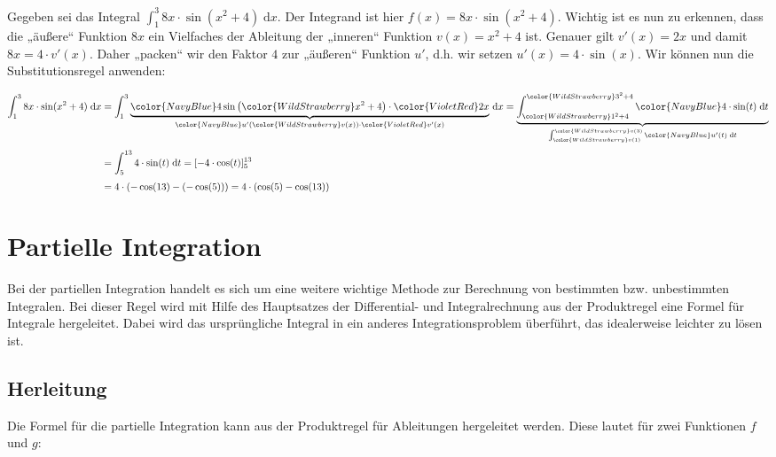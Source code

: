 \documentclass[fontsize=9pt,
               parskip=half-,
               DIV=14,
               listof=chapterentry,
               tocflat]{scrbook}
\begin{document}
\begin{example*}
Gegeben sei das Integral $\textstyle \int _{1}^{3}8x\cdot \sin(x^{2}+4)\;\mathrm {d} x$. Der Integrand ist hier $f(x)=8x\cdot \sin(x^{2}+4)$. Wichtig ist es nun zu erkennen, dass die „äußere“ Funktion $8x$ ein Vielfaches der Ableitung der „inneren“ Funktion $v(x)=x^{2}+4$ ist. Genauer gilt $v'(x)=2x$ und damit $8x=4\cdot v'(x)$. Daher „packen“ wir den Faktor $4$ zur „äußeren“ Funktion $u'$, d.h. wir setzen $u'(x)=4\cdot \sin(x)$. Wir können nun die Substitutionsregel anwenden:

\begin{align*}
\int _{1}^{3}8x\cdot \sin(x^{2}+4)\;\mathrm {d} x&=\int _{1}^{3}\underbrace {{\color {NavyBlue}4\sin \left({\color {WildStrawberry}x^{2}+4}\right)}\cdot {\color {VioletRed}2x}} _{{\color {NavyBlue}u'({\color {WildStrawberry}v(x)})}\cdot {\color {VioletRed}v'(x)}}\,\mathrm {d} x=\underbrace {\int _{\color {WildStrawberry}1^{2}+4}^{\color {WildStrawberry}3^{2}+4}{\color {NavyBlue}4\cdot \sin(t)}\;\mathrm {d} t} _{\int _{\color {WildStrawberry}v(1)}^{\color {WildStrawberry}v(3)}{\color {NavyBlue}u'(t)}\;\mathrm {d} t}\\[0.3em]&=\int _{5}^{13}4\cdot \sin(t)\;\mathrm {d} t=[-4\cdot \cos(t)]_{5}^{13}\\[0.3em]&=4\cdot (-\cos(13)-(-\cos(5)))=4\cdot (\cos(5)-\cos(13))
\end{align*}

\end{example*}

\chapter{Partielle Integration}

Bei der partiellen Integration handelt es sich um eine weitere wichtige Methode zur Berechnung von bestimmten bzw. unbestimmten Integralen. Bei dieser Regel wird mit Hilfe des Hauptsatzes der Differential- und Integralrechnung aus der Produktregel eine Formel für Integrale hergeleitet. Dabei wird das ursprüngliche Integral in ein anderes Integrationsproblem überführt, das idealerweise leichter zu lösen ist.

\section{Herleitung}

Die Formel für die partielle Integration kann aus der Produktregel für Ableitungen hergeleitet werden. Diese lautet für zwei Funktionen $f$ und $g$:
\end{document}
